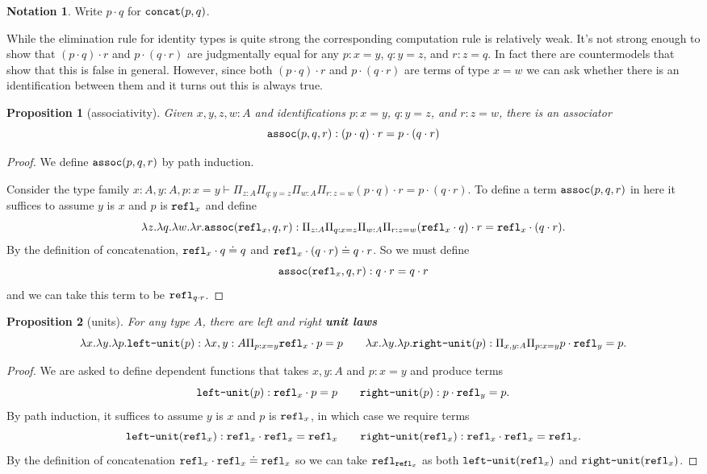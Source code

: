\documentclass{amsart}
\theoremstyle{theorem}
\newtheorem*{prop}{Proposition}
\theoremstyle{definition}
\newtheorem*{ntn}{Notation}
\theoremstyle{remark}
\newcommand{\0}{\mathbbe{0}}
\newcommand{\1}{\mathbbe{1}}
\newcommand{\2}{\mathbbe{2}}
\newcommand{\3}{\mathbbe{3}}
\newcommand{\4}{\mathbbe{4}}
\newcommand{\term}[1]{{\textup{\texttt{#1}}}}
\newcommand{\refl}{\term{refl}}
\newcommand{\concat}{\term{concat}}
\newcommand{\assoc}{\term{assoc}}
\begin{document}
\begin{ntn} Write $p \cdot q$ for $\concat(p,q)$.
\end{ntn}

While the elimination rule for identity types is quite strong the corresponding computation rule is relatively weak. It's not strong enough to show that $(p \cdot q) \cdot r$ and $p \cdot (q \cdot r)$ are judgmentally equal for any $p : x = y$, $q : y = z$, and $r : z = q$. In fact there are countermodels that show that this is false in general. However, since both $(p \cdot q) \cdot r$ and $p \cdot (q \cdot r)$ are terms of type $x = w$ we can ask whether there is an identification between them and it turns out this is always true.

\begin{prop}[associativity] Given $x,y,z,w  :A$ and identifications $p : x = y$, $q : y =z$, and $r : z = w$, there is an associator
\[ \assoc (p,q,r) : (p \cdot q) \cdot r = p \cdot (q \cdot r)\]
\end{prop}
\begin{proof} We define $\assoc(p,q,r)$ by path induction. 

Consider the type family $x :A, y : A, p: x = y \vdash \Pi_{z :A} \Pi_{q : y =z} \Pi_{w:A} \Pi_{r : z =w} (p \cdot q) \cdot r = p \cdot (q \cdot r)$. To define a term $\assoc (p,q,r)$ in here it suffices to assume $y$ is $x$ and $p$ is $\refl_x$ and define
\[ \lambda z. \lambda q. \lambda w. \lambda r. \assoc(\refl_x, q,r) : \Pi_{z :A} \Pi_{q : x =z} \Pi_{w:A} \Pi_{r : z =w} (\refl_x \cdot q) \cdot r = \refl_x \cdot (q \cdot r).\]
By the definition of concatenation, $\refl_x \cdot q \doteq q$ and $\refl_x \cdot (q \cdot r) \doteq q \cdot r$. So we must define 
\[ \assoc(\refl_x, q,r) :  q \cdot r = q \cdot r\]
and we can take this term to be $\refl_{q \cdot r}$.
\end{proof}

\begin{prop}[units] For any type $A$, there are left and right \textbf{unit laws}
\[ \lambda x. \lambda y. \lambda p. \term{left-unit}(p) :  \lambda {x,y : A} \Pi_{p: x = y} \refl_x \cdot p = p \qquad  \lambda x. \lambda y. \lambda p.\term{right-unit}(p) : \Pi_{x , y : A} \Pi_{p : x = y} p \cdot \refl_y = p.\]
\end{prop}
\begin{proof}
We are asked to define  dependent functions that takes $x, y :A$ and $p : x = y$ and produce terms
\[ \term{left-unit}(p) : \refl_x \cdot p = p \qquad \term{right-unit}(p) : p \cdot \refl_y = p.\]
By path induction, it suffices to assume $y$ is $x$ and $p$ is $\refl_x$, in which case we require terms
\[ \term{left-unit}(\refl_x) : \refl_x \cdot \refl_x = \refl_x \qquad \term{right-unit}(\refl_x) : \refl_x \cdot \refl_x = \refl_x.\] By the definition of concatenation $\refl_x \cdot \refl_x \doteq \refl_x$ so we can take $\refl_{\refl_x}$ as both $\term{left-unit}(\refl_x)$ and $\term{right-unit}(\refl_x)$.
\end{proof}
\end{document}
